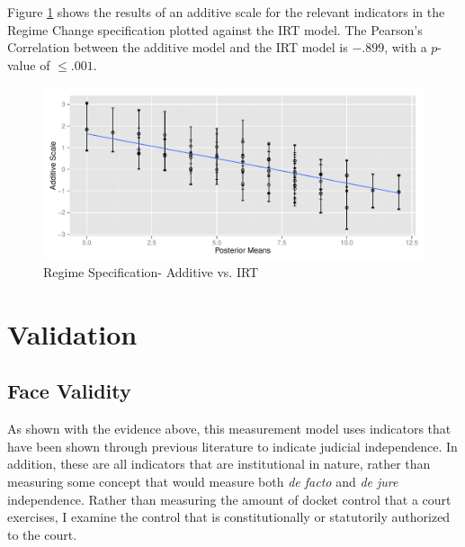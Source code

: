 \documentclass[12pt]{article}
\begin{document}
Figure \ref{fig:regime_additive_ggplot.pdf} shows the results of an additive scale for the relevant indicators in the Regime Change specification plotted against the IRT model.  The Pearson's Correlation between the additive model and the IRT model is $-.899$, with a $p$-value of $\leq.001$.

\begin{figure}
	\centering
	\caption{Regime Specification- Additive vs. IRT}
	\label{fig:regime_additive_ggplot.pdf}
	\includegraphics[width=0.7\linewidth]{graphics/regime/regime_additive_ggplot}
\end{figure}

\section{Validation}\label{Validation}
\subsection{Face Validity}
As shown with the evidence above, this measurement model uses indicators that have been shown through previous literature to indicate judicial independence. In addition, these are all indicators that are institutional in nature, rather than measuring some concept that would measure both \textit{de facto} and \textit{de jure} independence. Rather than measuring the amount of docket control that a court exercises, I examine the control that is constitutionally or statutorily authorized to the court.

\end{document}
